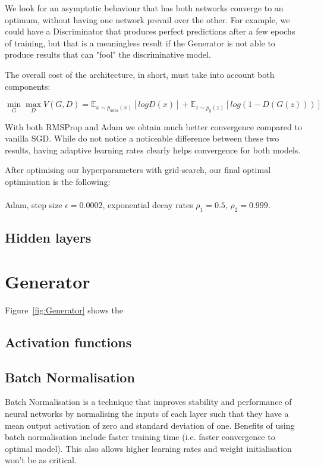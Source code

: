 We look for an asymptotic behaviour that has both networks converge to an optimum, without having one network prevail over the other. For example, we could have a Discriminator that produces perfect predictions after a few epochs of training, but that is a meaningless result if the Generator is not able to produce results that can "fool" the discriminative model.

The overall cost of the architecture, in short, must take into account both components:

\[\min_{G} \max_{D} V(G, D) = \mathbb{E}_{x\sim p_{data}(x)}[log D(x)] + \mathbb{E}_{z \sim p_{g}(z)}[log(1-D(G(z)))] \]

With both RMSProp and Adam we obtain much better convergence compared to vanilla SGD. While do not notice a noticeable difference between these two results, having adaptive learning rates clearly helps convergence for both models.

After optimising our hyperparameters with grid-search, our final optimal optimisation is the following: \\\\
Adam, step size $\epsilon = 0.0002$, exponential decay rates $\rho_1 = 0.5$, $\rho_2 = 0.999$.


\subsection{Hidden layers}





\section{Generator}
Figure~\ref{fig:Generator} shows the 

\subsection{Activation functions}

\subsection{Batch Normalisation}
Batch Normalisation \citep{DBLP:journals/corr/IoffeS15} is a technique that improves stability and performance of neural networks by normalising the inputs of each layer such that they have a mean output activation of zero and standard deviation of one. Benefits of using batch normalisation include faster training time (i.e. faster convergence to optimal model). This also allows higher learning rates and weight initialisation won't be as critical.


